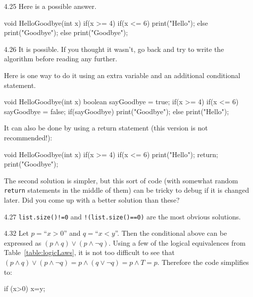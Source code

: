 \begin{Answer}{4.25}
Here is a possible answer.
\begin{code}
    void HelloGoodbye(int x) {
        if(x >= 4) {
            if(x <= 6) {
                print("Hello");
            } else {
                print("Goodbye");
            }
        } else {
            print("Goodbye");
        }
    }
\end{code}
\end{Answer}
\begin{Answer}{4.26}
It is possible.  If you thought it wasn't, go back and try to write the algorithm before
reading any further.

Here is one way to do it using an extra variable and an additional conditional statement.
\begin{code}
    void HelloGoodbye(int x) {
        boolean sayGoodbye = true;
        if(x >= 4) {
            if(x <= 6) {
                sayGoodbye = false;
            }
        }
        if(sayGoodbye) {
            print("Goodbye");
        } else {
            print("Hello");
        }
    }
\end{code}
It can also be done by using a return statement
(this version is not recommended!):
\begin{code}
    void HelloGoodbye(int x) {
        if(x >= 4) {
            if(x <= 6) {
                print("Hello");
                return;
            }
        }
        print("Goodbye");
    }
\end{code}
The second solution is simpler,
but this sort of code (with somewhat random \verb+return+ statements in the middle
of them) can be tricky to debug if it is changed later.
Did you come up with a better solution than these?
\end{Answer}
\begin{Answer}{4.27}
\verb+list.size()!=0+ and \verb+!(list.size()==0)+ are the most obvious solutions.
\end{Answer}
\begin{Answer}{4.32}
Let $p=$``$x>0$'' and $q=$``$x<y$''.
Then the conditional above can be expressed as $(p\wedge q)\vee (p\wedge \neg q)$.
Using a few of the logical equivalences from Table~\ref{table:logicLaws},
it is not too difficult to see that
 $(p\wedge q) \vee (p\wedge \neg q) = p\wedge (q \vee \neg q) = p\wedge T = p.$
Therefore the code simplifies to:
\begin{code}
    if (x>0) {
        x=y;
    }
\end{code}
\end{Answer}
